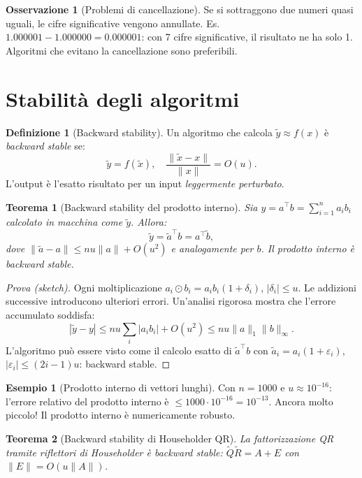 \documentclass[11pt, a4paper, twoside]{book}
\theoremstyle{definition}
\newtheorem{defn}{Definizione}[chapter]
\newtheorem{example}{Esempio}[chapter]
\newtheorem{remark}{Osservazione}[chapter]
\theoremstyle{plain}
\newtheorem{thm}{Teorema}[chapter]
\theoremstyle{remark}
\begin{document}
\begin{remark}[Problemi di cancellazione]
Se si sottraggono due numeri quasi uguali, le cifre significative vengono annullate. Es.\ $1.000001 - 1.000000 = 0.000001$: con 7 cifre significative, il risultato ne ha solo 1. Algoritmi che evitano la cancellazione sono preferibili.
\end{remark}

\section{Stabilità degli algoritmi}
\label{sec:stabilita}

\begin{defn}[Backward stability]
Un algoritmo che calcola $\tilde{y} \approx f(x)$ è \emph{backward stable} se:
\[
  \tilde{y} = f(\tilde{x}), \quad \frac{\|\tilde{x} - x\|}{\|x\|} = O(u).
\]
L'output è l'esatto risultato per un input \emph{leggermente perturbato}.
\end{defn}

\begin{thm}[Backward stability del prodotto interno]
Sia $y = a^\top b = \sum_{i=1}^n a_i b_i$ calcolato in macchina come $\tilde{y}$. Allora:
\[
  \tilde{y} = \tilde{a}^\top b = a^\top \tilde{b},
\]
dove $\|\tilde{a} - a\| \leq nu\|a\| + O(u^2)$ e analogamente per $b$. Il prodotto interno è backward stable.
\end{thm}

\begin{proof}[Prova (sketch)]
Ogni moltiplicazione $a_i \odot b_i = a_i b_i(1+\delta_i)$, $|\delta_i| \leq u$. Le addizioni successive introducono ulteriori errori. Un'analisi rigorosa mostra che l'errore accumulato soddisfa:
\[
  |\tilde{y} - y| \leq nu \sum_i |a_i b_i| + O(u^2) \leq nu \|a\|_1\|b\|_\infty.
\]
L'algoritmo può essere visto come il calcolo esatto di $\tilde{a}^\top b$ con $\tilde{a}_i = a_i(1+\varepsilon_i)$, $|\varepsilon_i| \leq (2i-1)u$: backward stable.
\end{proof}

\begin{example}[Prodotto interno di vettori lunghi]
Con $n = 1000$ e $u \approx 10^{-16}$: l'errore relativo del prodotto interno è $\leq 1000 \cdot 10^{-16} = 10^{-13}$. Ancora molto piccolo! Il prodotto interno è numericamente robusto.
\end{example}

\begin{thm}[Backward stability di Householder QR]
La fattorizzazione QR tramite riflettori di Householder è backward stable: $\tilde{Q}\tilde{R} = A + E$ con $\|E\| = O(u\|A\|)$.
\end{thm}
\end{document}
